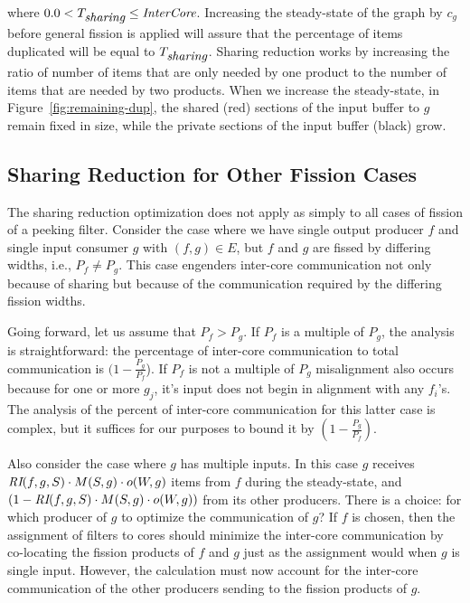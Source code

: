 \noindent where $0.0 < T_{\mbox{\it sharing}} \le
\mbox{\it InterCore}$. Increasing the steady-state of the graph by $c_g$
before general fission is applied will assure that the percentage of
items duplicated will be equal to $T_{\mbox{\it sharing}}$.  Sharing
reduction works by increasing the ratio of number of items that are
only needed by one product to the number of items that are needed by
two products.  When we increase the steady-state, in
Figure~\ref{fig:remaining-dup}, the shared (red) sections of the input
buffer to $g$ remain fixed in size, while the private sections of the
input buffer (black) grow.

\subsection{Sharing Reduction for Other Fission Cases}

The sharing reduction optimization does not apply as simply to all
cases of fission of a peeking filter.  Consider the case where we have
single output producer $f$ and single input consumer $g$ with $(f,g)
\in E$, but $f$ and $g$ are fissed by differing widths, i.e., $P_f \ne
P_g$.  This case engenders inter-core communication not only because
of sharing but because of the communication required by the differing
fission widths.  

Going forward, let us assume that $P_f > P_g$.  If $P_f$ is a multiple
of $P_g$, the analysis is straightforward: the percentage of
inter-core communication to total communication is $(1 -
\frac{P_g}{P_f}$). If $P_f$ is not a multiple of $P_g$ misalignment
also occurs because for one or more $g_j$, it's input does not begin
in alignment with any $f_i$'s.  The analysis of the percent of
inter-core communication for this latter case is complex, but it
suffices for our purposes to bound it by $(1 - \frac{P_g}{P_f})$.

Also consider the case where $g$ has multiple inputs. In this case $g$
receives $\mbox{\it RI}(f, g, S) \cdot M(S, g) \cdot o(W,g)$ items from $f$
during the steady-state, and $(1 -\mbox{\it RI}(f, g, S) \cdot M(S, g) \cdot
o(W,g))$ from its other producers. There is a choice: for which
producer of $g$ to optimize the communication of $g$? If $f$ is
chosen, then the assignment of filters to cores should minimize the
inter-core communication by co-locating the fission products of $f$
and $g$ just as the assignment would when $g$ is single input.
However, the calculation must now account for the inter-core
communication of the other producers sending to the fission products
of $g$. 

